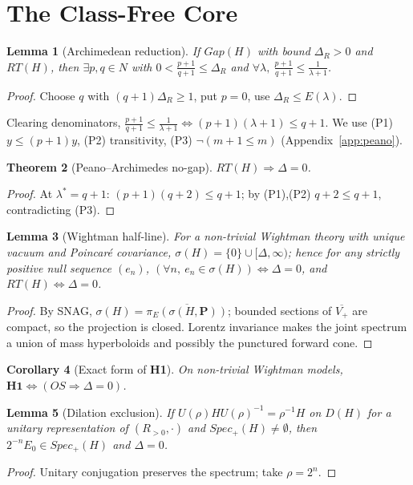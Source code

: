 \documentclass[11pt,a4paper]{article}
\def\R{R}\def\N{N}\def\Q{Q}\def\Z{Z}\def\Class{C}\def\OS{OS}\def\Gap{Gap}%
\def\RT{RT}\def\Obstr{Obstr}\def\Spec{Spec}\def\Htot{H}\def\Chit{chi-t}\def\Lean#1{#1}}
\theoremstyle{plain}
\newtheorem{theorem}{Theorem}[section]
\newtheorem{lemma}[theorem]{Lemma}
\newtheorem{corollary}[theorem]{Corollary}
\theoremstyle{definition}
\theoremstyle{remark}
\newcommand{\R}{\mathbb{R}}\newcommand{\N}{\mathbb{N}}\newcommand{\Q}{\mathbb{Q}}
\newcommand{\Z}{\mathbb{Z}}\newcommand{\Spec}{\operatorname{Spec}}
\newcommand{\OS}{\mathrm{OS}}\newcommand{\Gap}{\mathrm{Gap}}
\newcommand{\Obstr}{\mathrm{Obstr}}\newcommand{\RT}{\mathrm{RT}}
\newcommand{\Class}{\mathcal{C}}\newcommand{\Htot}{\mathcal{H}}
\newcommand{\Chit}{\chi_t}
\renewcommand{\_}{\oldunderscore\allowbreak}
\newcommand{\Lean}[1]{\texttt{\small #1}}
\begin{document}
\section{The Class-Free Core}\label{sec:core}
\begin{lemma}[Archimedean reduction]\label{lem:arch}
If $\Gap(H)$ with bound $\Delta_\R>0$ and $\RT(H)$, then $\exists p,q\in\N$ with
$0<\frac{p+1}{q+1}\le\Delta_\R$ and $\forall\lambda,\ \frac{p+1}{q+1}\le\frac1{\lambda+1}$.
\end{lemma}
\begin{proof}
Choose $q$ with $(q+1)\Delta_\R\ge1$, put $p=0$, use $\Delta_\R\le E(\lambda)$.
\end{proof}
Clearing denominators, $\frac{p+1}{q+1}\le\frac1{\lambda+1}\iff(p+1)(\lambda+1)\le q+1$. We use
(P1) $y\le(p+1)y$, (P2) transitivity, (P3) $\neg(m+1\le m)$ (Appendix~\ref{app:peano}).
\begin{theorem}[Peano--Archimedes no-gap]\label{thm:peano}
$\RT(H)\Rightarrow\Delta=0$.
\end{theorem}
\begin{proof}
At $\lambda^\ast=q+1$: $(p+1)(q+2)\le q+1$; by (P1),(P2) $q+2\le q+1$, contradicting (P3).
\end{proof}
\begin{lemma}[Wightman half-line]\label{lem:halfline}
For a non-trivial Wightman theory with unique vacuum and Poincar\'e covariance,
$\sigma(H)=\{0\}\cup[\Delta,\infty)$; hence for \emph{any} strictly positive null sequence
$(e_n)$, $(\forall n,\ e_n\in\sigma(H))\iff\Delta=0$, and $\RT(H)\iff\Delta=0$.
\end{lemma}
\begin{proof}
By SNAG, $\sigma(H)=\overline{\pi_E(\sigma(H,\mathbf P))}$; bounded sections of $\overline{V_+}$
are compact, so the projection is closed. Lorentz invariance makes the joint spectrum a union of
mass hyperboloids and possibly the punctured forward cone.
\end{proof}
\begin{corollary}[Exact form of \textbf{H1}]\label{cor:h1}
On non-trivial Wightman models, $\textbf{H1}\iff(\OS\Rightarrow\Delta=0)$.
\end{corollary}
\begin{lemma}[Dilation exclusion]\label{lem:dilation}
If $U(\rho)HU(\rho)^{-1}=\rho^{-1}H$ on $D(H)$ for a unitary representation of
$(\R_{>0},\cdot)$ and $\Spec_+(H)\neq\emptyset$, then $2^{-n}E_0\in\Spec_+(H)$ and $\Delta=0$.
\end{lemma}
\begin{proof}
Unitary conjugation preserves the spectrum; take $\rho=2^n$.
\end{proof}
\end{document}
